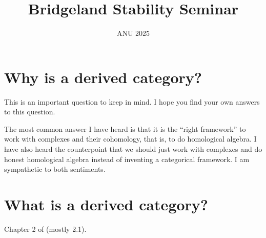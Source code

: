 \documentclass{amsart}
\title{Bridgeland Stability Seminar}
\author{ANU 2025}
\newcommand{\me}[1]{\marginpar{\small{#1}}}
\begin{document}
\maketitle

\section{Why is a derived category?}
\me{Anand}

This is an important question to keep in mind.  I hope you find your own answers to this question.

The most common answer I have heard is that it is the ``right framework'' to work with complexes and their cohomology, that is, to do homological algebra.  I have also heard the counterpoint that we should just work with complexes and do honest homological algebra instead of inventing a categorical framework.  I am sympathetic to both sentiments.

\section{What is a derived category?}

Chapter 2 of \cite{fmtag} (mostly 2.1).
\end{document}
